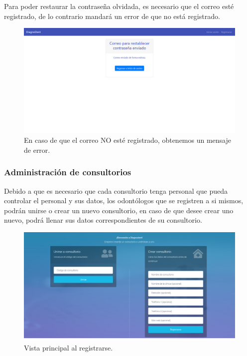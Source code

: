 Para poder restaurar la contraseña olvidada, es necesario que el correo esté registrado, de lo contrario mandará un error de que no está registrado.

\begin{figure}[H]
\centering
\includegraphics[width=17cm,keepaspectratio]{pictures/adminodo/login/olvidar-pw-2.png}
\caption{En caso de que el correo NO esté registrado, obtenemos un mensaje de error.}
\end{figure}

\subsubsection{Administración de consultorios}

Debido a que es necesario que cada consultorio tenga personal que pueda controlar el personal y sus datos, los odontólogos que se registren a si mismos, podrán unirse o crear un nuevo consultorio, en caso de que desee crear uno nuevo, podrá llenar sus datos correspondientes de su consultorio.

\begin{figure}[H]
\centering
\includegraphics[width=17cm,keepaspectratio]{pictures/adminodo/login/inicio-crear-consultorio.png}
\caption{Vista principal al registrarse.}
\end{figure}


